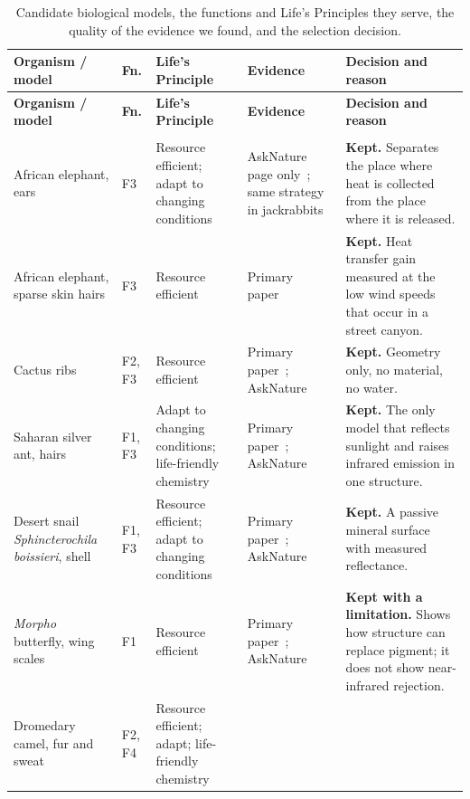 
{\footnotesize
\renewcommand{\arraystretch}{1.15}
\begin{longtable}{L{2.5cm} L{1.2cm} L{2.2cm} L{2.9cm} L{4.9cm}}
\caption{Candidate biological models, the functions and Life's Principles they serve,
the quality of the evidence we found, and the selection decision.}
\label{tab:models}\\
\toprule
\textbf{Organism / model} & \textbf{Fn.} & \textbf{Life's Principle} &
\textbf{Evidence} & \textbf{Decision and reason} \\
\midrule
\endfirsthead
\toprule
\textbf{Organism / model} & \textbf{Fn.} & \textbf{Life's Principle} &
\textbf{Evidence} & \textbf{Decision and reason} \\
\midrule
\endhead
\bottomrule
\endfoot
{}\\
African elephant, ears & F3 & Resource efficient; adapt to changing conditions &
AskNature page only~\cite{asknature_ears}; same strategy in jackrabbits~\cite{asknature_jackrabbit} &
\textbf{Kept.} Separates the place where heat is collected from the place where it is released. \\
African elephant, sparse skin hairs & F3 & Resource efficient &
Primary paper~\cite{myhrvold2012} &
\textbf{Kept.} Heat transfer gain measured at the low wind speeds that occur in a street canyon. \\
Cactus ribs & F2, F3 & Resource efficient &
Primary paper~\cite{lewis1977}; AskNature~\cite{asknature_cactus} &
\textbf{Kept.} Geometry only, no material, no water. \\
Saharan silver ant, hairs & F1, F3 & Adapt to changing conditions; life-friendly chemistry &
Primary paper~\cite{shi2015}; AskNature~\cite{asknature_anthair} &
\textbf{Kept.} The only model that reflects sunlight and raises infrared emission in one structure. \\
Desert snail \emph{Sphincterochila boissieri}, shell & F1, F3 & Resource efficient; adapt to changing conditions &
Primary paper~\cite{schmidtnielsen1971}; AskNature~\cite{asknature_snail} &
\textbf{Kept.} A passive mineral surface with measured reflectance. \\
\emph{Morpho} butterfly, wing scales & F1 & Resource efficient &
Primary paper~\cite{giraldo2016}; AskNature~\cite{asknature_morpho} &
\textbf{Kept with a limitation.} Shows how structure can replace pigment; it does not show near-infrared rejection. \\
Dromedary camel, fur and sweat & F2, F4 & Resource efficient; adapt; life-friendly chemistry &

\end{longtable}}
